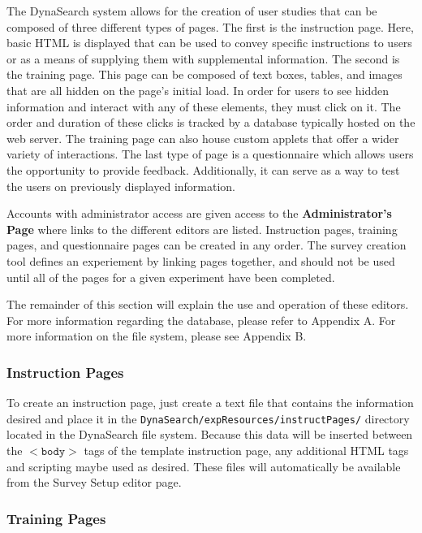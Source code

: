 \documentclass[article]{ij4uq}              %
\begin{document}
The DynaSearch system allows for the creation of user studies that can be composed of three different types of pages. The first is the instruction page. Here, basic HTML is displayed that can be used to convey specific instructions to users or as a means of supplying them with supplemental information. The second is the training page. This page can be composed of text boxes, tables, and images that are all hidden on the page's initial load.  In order for users to see hidden information and interact with any of these elements, they must click on it. The order and duration of these clicks is tracked by a database typically hosted on the web server. The training page can also house custom applets that offer a wider variety of interactions.  The last type of page is a questionnaire which allows users the opportunity to provide feedback.  Additionally, it can serve as a way to test the users on previously displayed information.

Accounts with administrator access are given access to the \textbf{Administrator's Page} where links to the different editors are listed. Instruction pages, training pages, and questionnaire pages can be created in any order. The survey creation tool defines an experiement by linking pages together, and should not be used until all of the pages for a given experiment have been completed.

The remainder of this section will explain the use and operation of these editors. For more information regarding the database, please refer to Appendix A. For more information on the file system, please see Appendix B.

\subsubsection{Instruction Pages}
To create an instruction page, just create a text file that contains the information desired and place it in the \newline \texttt{DynaSearch/expResources/instructPages/} directory located in the DynaSearch file system. Because this data will be inserted between the $<\texttt{body}>$ tags of the template instruction page, any additional HTML tags and scripting maybe used as desired. These files will automatically be available from the Survey Setup editor page. 

\subsubsection{Training Pages}
\end{document}
